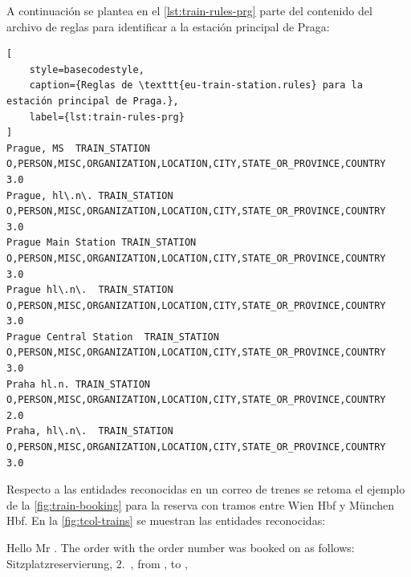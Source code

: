 A continuación se plantea en el \autoref{lst:train-rules-prg} parte del contenido del archivo de reglas para
identificar a la estación principal de Praga:

\begin{lstlisting}[
    style=basecodestyle,
    caption={Reglas de \texttt{eu-train-station.rules} para la estación principal de Praga.},
    label={lst:train-rules-prg}
]
Prague, MS	TRAIN_STATION	O,PERSON,MISC,ORGANIZATION,LOCATION,CITY,STATE_OR_PROVINCE,COUNTRY	3.0
Prague, hl\.n\.	TRAIN_STATION	O,PERSON,MISC,ORGANIZATION,LOCATION,CITY,STATE_OR_PROVINCE,COUNTRY	3.0
Prague Main Station	TRAIN_STATION	O,PERSON,MISC,ORGANIZATION,LOCATION,CITY,STATE_OR_PROVINCE,COUNTRY	3.0
Prague hl\.n\.	TRAIN_STATION	O,PERSON,MISC,ORGANIZATION,LOCATION,CITY,STATE_OR_PROVINCE,COUNTRY	3.0
Prague Central Station	TRAIN_STATION	O,PERSON,MISC,ORGANIZATION,LOCATION,CITY,STATE_OR_PROVINCE,COUNTRY	3.0
Praha hl.n.	TRAIN_STATION	O,PERSON,MISC,ORGANIZATION,LOCATION,CITY,STATE_OR_PROVINCE,COUNTRY	2.0
Praha, hl\.n\.	TRAIN_STATION	O,PERSON,MISC,ORGANIZATION,LOCATION,CITY,STATE_OR_PROVINCE,COUNTRY	3.0
\end{lstlisting}

Respecto a las entidades reconocidas en un correo de trenes se retoma el ejemplo de la \autoref{fig:train-booking} para
la reserva con tramos entre Wien Hbf y München Hbf.
En la \autoref{fig:tcol-trains} se muestran las entidades reconocidas:
\pagebreak
\begin{tcolorbox}[
    colback=black!2,
    colframe=black!35,
    title={Entidades reconocidas en un fragmento de texto de una reserva de tren},
    breakable
]

    \medskip
    \noindent

    {\raggedright%
    Hello Mr .
    The order with the order number  was booked on 
    as follows:
    Sitzplatzreservierung, 2.\ , 
    from , 
    to , \par
    }

    \medskip
    \noindent

\end{tcolorbox}
\noindent\begin{minipage}{\linewidth}
    \captionsetup{type=figure,hypcap=false}
    \caption{Entidades reconocidas.}%
    \label{fig:tcol-trains}
\end{minipage}

